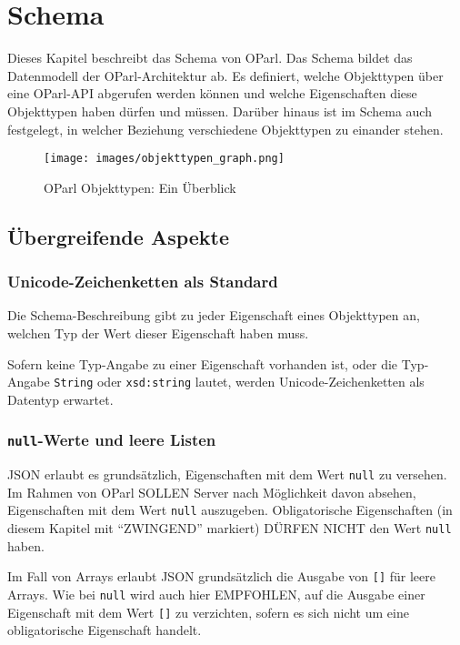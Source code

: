 \documentclass[,a4paper]{article}
\makeatletter
\def\maxwidth{\ifdim\Gin@nat@width>\linewidth\linewidth
\else\Gin@nat@width\fi}
\let\Oldincludegraphics\includegraphics
\renewcommand{\includegraphics}[1]{\Oldincludegraphics[width=\maxwidth]{#1}}
\makeatother
\begin{document}
\section{Schema}\label{schema}

Dieses Kapitel beschreibt das Schema von OParl. Das Schema bildet das
Datenmodell der OParl-Architektur ab. Es definiert, welche Objekttypen
über eine OParl-API abgerufen werden können und welche Eigenschaften
diese Objekttypen haben dürfen und müssen. Darüber hinaus ist im Schema
auch festgelegt, in welcher Beziehung verschiedene Objekttypen zu
einander stehen.

\begin{figure}[htbp]
\centering
\texttt{[image: images/objekttypen\_graph.png]}
\caption{OParl Objekttypen: Ein Überblick}
\end{figure}

\subsection{Übergreifende Aspekte}\label{uxfcbergreifende-aspekte}

\subsubsection{Unicode-Zeichenketten als
Standard}\label{unicodeux5fzeichenketten}

Die Schema-Beschreibung gibt zu jeder Eigenschaft eines Objekttypen an,
welchen Typ der Wert dieser Eigenschaft haben muss.

Sofern keine Typ-Angabe zu einer Eigenschaft vorhanden ist, oder die
Typ-Angabe \texttt{String} oder \texttt{xsd:string} lautet, werden
Unicode-Zeichenketten als Datentyp erwartet.

\subsubsection{\texttt{null}-Werte und leere
Listen}\label{null-werte-und-leere-listen}

JSON erlaubt es grundsätzlich, Eigenschaften mit dem Wert \texttt{null}
zu versehen. Im Rahmen von OParl SOLLEN Server nach Möglichkeit davon
absehen, Eigenschaften mit dem Wert \texttt{null} auszugeben.
Obligatorische Eigenschaften (in diesem Kapitel mit ``ZWINGEND''
markiert) DÜRFEN NICHT den Wert \texttt{null} haben.

Im Fall von Arrays erlaubt JSON grundsätzlich die Ausgabe von
\texttt{{[}{]}} für leere Arrays. Wie bei \texttt{null} wird auch hier
EMPFOHLEN, auf die Ausgabe einer Eigenschaft mit dem Wert
\texttt{{[}{]}} zu verzichten, sofern es sich nicht um eine
obligatorische Eigenschaft handelt.
\end{document}

